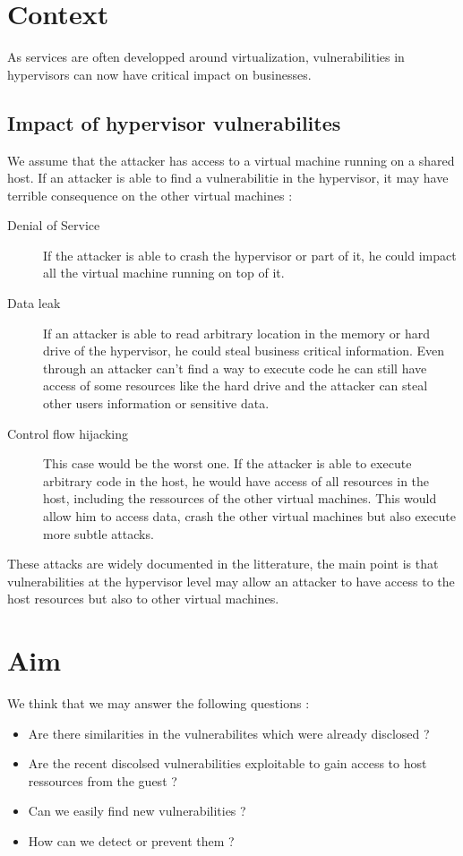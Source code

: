 \section{Context}
As services are often developped around virtualization, vulnerabilities in hypervisors can now
have critical impact on businesses.

\subsection{Impact of hypervisor vulnerabilites}
We assume that the attacker has access to a virtual machine running on a shared
host.
If an attacker is able to find a vulnerabilitie in the hypervisor, it may have
terrible consequence on the other virtual machines :
\begin{description}
\item[Denial of Service] If the attacker is able to crash the hypervisor or part
of it, he could impact all the virtual machine running on top of it.
\item[Data leak] If an attacker is able to read arbitrary location in the memory
or hard drive of the hypervisor, he could steal business critical information.
Even through an attacker can't find a way to execute code he can still have
access of some resources like the hard drive and the attacker can steal
other users information or sensitive data.
\item[Control flow hijacking] This case would be the worst one. If the attacker
is able to execute arbitrary code in the host, he would have access of all
resources in the host, including the ressources of the other virtual machines.
This would allow him to access data, crash the other virtual machines but also
execute more subtle attacks.
\end{description}

These attacks are widely documented in the litterature, the main point is that
vulnerabilities at the hypervisor level may allow an attacker to have access to
the host resources but also to other virtual machines.

\section{Aim}
We think that we may answer the following questions :
\begin{itemize}
\item Are there similarities in the vulnerabilites which were already disclosed ?
\item Are the recent discolsed vulnerabilities exploitable to gain access to host
ressources from the guest ?
\item Can we easily find new vulnerabilities ?
\item How can we detect or prevent them ?
\end{itemize}

